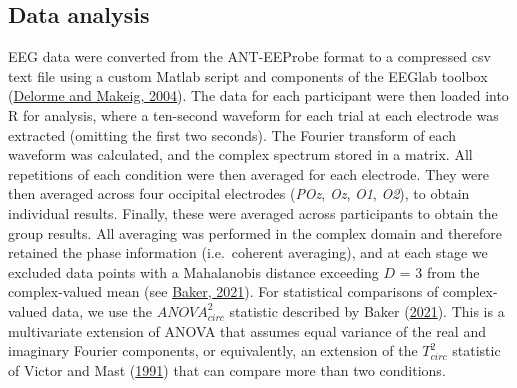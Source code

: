 \documentclass[
]{article}
\begin{document}
\hypertarget{data-analysis}{%
\subsection{Data analysis}\label{data-analysis}}

EEG data were converted from the ANT-EEProbe format to a compressed csv text file using a custom Matlab script and components of the EEGlab toolbox (\protect\hyperlink{ref-Delorme2004}{Delorme and Makeig, 2004}). The data for each participant were then loaded into R for analysis, where a ten-second waveform for each trial at each electrode was extracted (omitting the first two seconds). The Fourier transform of each waveform was calculated, and the complex spectrum stored in a matrix. All repetitions of each condition were then averaged for each electrode. They were then averaged across four occipital electrodes (\emph{POz}, \emph{Oz}, \emph{O1}, \emph{O2}), to obtain individual results. Finally, these were averaged across participants to obtain the group results. All averaging was performed in the complex domain and therefore retained the phase information (i.e.~coherent averaging), and at each stage we excluded data points with a Mahalanobis distance exceeding \(D\) = 3 from the complex-valued mean (see \protect\hyperlink{ref-Baker2021}{Baker, 2021}). For statistical comparisons of complex-valued data, we use the \(ANOVA^2_{circ}\) statistic described by Baker (\protect\hyperlink{ref-Baker2021}{2021}). This is a multivariate extension of ANOVA that assumes equal variance of the real and imaginary Fourier components, or equivalently, an extension of the \(T^2_{circ}\) statistic of Victor and Mast (\protect\hyperlink{ref-Victor1991}{1991}) that can compare more than two conditions.
\end{document}
